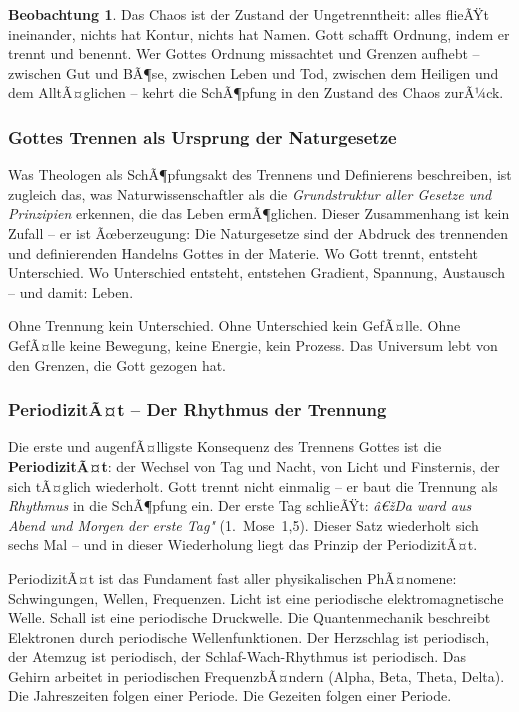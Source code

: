 ﻿\documentclass[a4paper,12pt]{article}
\theoremstyle{definition}
\newtheorem{observation}{Beobachtung}[section]
\begin{document}
\begin{observation}
	Das Chaos ist der Zustand der Ungetrenntheit: alles flieÃŸt ineinander, nichts
	hat Kontur, nichts hat Namen. Gott schafft Ordnung, indem er trennt und benennt.
	Wer Gottes Ordnung missachtet und Grenzen aufhebt -- zwischen Gut und BÃ¶se,
	zwischen Leben und Tod, zwischen dem Heiligen und dem AlltÃ¤glichen -- kehrt
	die SchÃ¶pfung in den Zustand des Chaos zurÃ¼ck.
\end{observation}

\subsubsection{Gottes Trennen als Ursprung der Naturgesetze}

Was Theologen als SchÃ¶pfungsakt des Trennens und Definierens beschreiben, ist
zugleich das, was Naturwissenschaftler als die \textit{Grundstruktur aller Gesetze
	und Prinzipien} erkennen, die das Leben ermÃ¶glichen. Dieser Zusammenhang ist kein
Zufall -- er ist Ãœberzeugung: Die Naturgesetze sind der Abdruck des trennenden
und definierenden Handelns Gottes in der Materie. Wo Gott trennt, entsteht
Unterschied. Wo Unterschied entsteht, entstehen Gradient, Spannung, Austausch --
und damit: Leben.

Ohne Trennung kein Unterschied. Ohne Unterschied kein GefÃ¤lle. Ohne GefÃ¤lle keine
Bewegung, keine Energie, kein Prozess. Das Universum lebt von den Grenzen, die
Gott gezogen hat.

\subsubsection{PeriodizitÃ¤t -- Der Rhythmus der Trennung}

Die erste und augenfÃ¤lligste Konsequenz des Trennens Gottes ist die
\textbf{PeriodizitÃ¤t}: der Wechsel von Tag und Nacht, von Licht und Finsternis,
der sich tÃ¤glich wiederholt. Gott trennt nicht einmalig -- er baut die Trennung
als \textit{Rhythmus} in die SchÃ¶pfung ein. Der erste Tag schlieÃŸt: \textit{â€žDa
	ward aus Abend und Morgen der erste Tag"} (1.~Mose~1,5). Dieser Satz wiederholt
sich sechs Mal -- und in dieser Wiederholung liegt das Prinzip der PeriodizitÃ¤t.

PeriodizitÃ¤t ist das Fundament fast aller physikalischen PhÃ¤nomene: Schwingungen,
Wellen, Frequenzen. Licht ist eine periodische elektromagnetische Welle. Schall
ist eine periodische Druckwelle. Die Quantenmechanik beschreibt Elektronen durch
periodische Wellenfunktionen. Der Herzschlag ist periodisch, der Atemzug ist
periodisch, der Schlaf-Wach-Rhythmus ist periodisch. Das Gehirn arbeitet in
periodischen FrequenzbÃ¤ndern (Alpha, Beta, Theta, Delta). Die Jahreszeiten folgen
einer Periode. Die Gezeiten folgen einer Periode.
\end{document}

